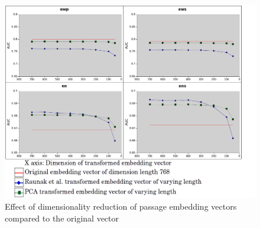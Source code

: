 \documentclass[sigconf,authordraft]{acmart}
\begin{document}
\begin{figure}[h]
  \centering
  \includegraphics[width=\linewidth]{graphics/emb_vec_dim_red_exp.png}
  \caption{Effect of dimensionality reduction of passage embedding vectors compared to the original vector}
  \label{fig:dimred}
\end{figure}



\end{document}
